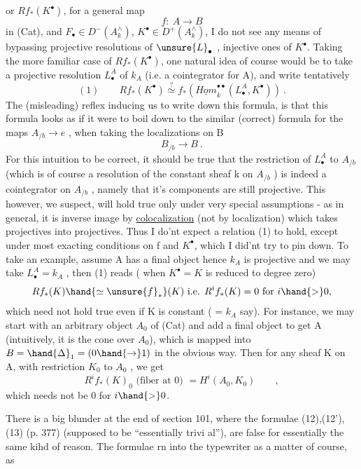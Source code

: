 
or $Rf_{*}(K^{\bullet})$,  for a general map 
\[ f:\ A \longrightarrow B \]
in (Cat),  and   $F_{\bullet}\in D^{-}(A^{\wedge}_{k})$,  $K^{\bullet}\in D^{+}(A^{\wedge}_{k})$,  I do not see any means of
bypassing projective resolutions of $\unsure{L}_{\bullet}$ , injective ones of $K^{\bullet}$.  Taking
the more familiar case of $Rf_{*}(K^{\bullet})$,  one natural idea of course would
be to take a projective resolution  $L^{A}_{\bullet}$ of $k_{A}$ (i.e. a cointegrator for
A),  and write  tentatively
\[ (1) \qquad Rf_{*}(K^{\bullet}) \overset{?}{\simeq} f_{*}(\underline{Hom}^{\bullet\bullet}_{k}(L^{A}_{\bullet},K^{\bullet}))\ . \]
The (misleading) reflex inducing us to write down this formula, is that
this formula looks as if it were to boil down to the similar (correct)
formula for the maps $A_{/b}\longrightarrow e$ ,  when taking the localizations on B
\[ B_{/b}\longrightarrow B\ . \]
For this intuition to be correct,   it should be true that the
restriction of  $L^{A}_{\bullet}$  to $A_{/b}$  (which is of course a resolution of the
constant sheaf k on $A_{/b}$ ) is indeed a cointegrator on $A_{/b}$ ,  namely
that it's components are still projective.  This however,  we suspect,
will hold true only under very special assumptions  -  as in general,
it is inverse image by \uline{colocalization} (not by localization) which
takes projectives into projectives.  Thus I do'nt expect a relation (1)
to hold,  except under most exacting conditions on f and $K^{\bullet}$,  which I
did'nt try to pin down.  To take an example,  assume A has a final
object hence $k_{A}$ is projective and we may take $L^{A}_{\bullet}=k_{A}$ ,  then (1)
reads ( when $K^{\bullet}=K$ is reduced to degree zero)
\[ Rf_{*}(K)\hand{\simeq \unsure{f}_{*}}(K) \text{ i.e. } R^{i}f_{*}(K)=0 \text{ for } i \hand{>} 0, \]
which need not hold true even if  K is constant ( = $k_{A}$ say).  For
instance,  we may start with an arbitrary object $A_{0}$ of (Cat) and add
a final object to get A (intuitively,  it is the cone over $A_{0}$),  which
is mapped into $B = \hand{\Delta}_{1} = (0 \hand{\to} 1)$\hand{,} in the obvious way.  Then for any
sheaf K on A,  with restriction $K_{0}$ to $A_{0}$ ,  we get
\[ R^{i}f_{*}(K)_{0} \text{ (fiber at 0) } = H^{i}(A_{0},K_{0}) \qquad , \]
which needs not be 0 for $i \hand{>} 0$.

There is a big blunder at the end of section 101,  where the
formulae (12),(12'),(13) (p. 377)  (supposed to be ``essentially trivi%
al''),  are false for essentially the same kihd of reason.  The 
 formulae rn into the typewriter as a matter of course,  as 

